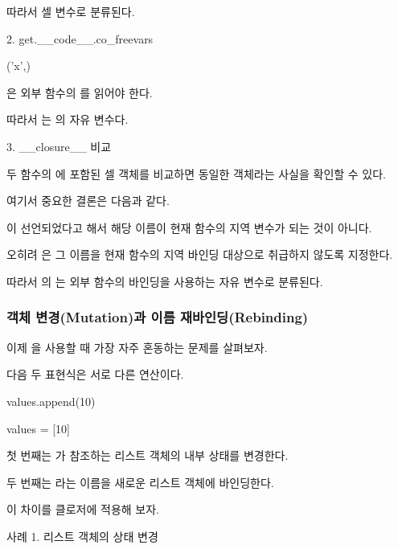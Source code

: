 따라서 셀 변수로 분류된다.

\begin{dhknote}
\begin{dhksmry}[centered]
2. get.__code__.co_freevars
\end{dhksmry}
\end{dhknote}

\begin{dhkzsh}
('x',)
\end{dhkzsh}

은 외부 함수의 를 읽어야 한다.

따라서 는 의 자유 변수다.

\begin{dhknote}
\begin{dhksmry}[centered]
3. __closure__ 비교
\end{dhksmry}
\end{dhknote}

두 함수의 에 포함된 셀 객체를 비교하면 동일한 객체라는 사실을 확인할 수 있다.

여기서 중요한 결론은 다음과 같다.

이 선언되었다고 해서 해당 이름이 현재 함수의 지역 변수가 되는 것이 아니다.

오히려 은 그 이름을 현재 함수의 지역 바인딩 대상으로 취급하지 않도록 지정한다.

따라서 의 는 외부 함수의 바인딩을 사용하는 자유 변수로 분류된다.

\subsubsection{객체 변경(Mutation)과 이름 재바인딩(Rebinding)}

이제 을 사용할 때 가장 자주 혼동하는 문제를 살펴보자.

다음 두 표현식은 서로 다른 연산이다.

\begin{dhkcode}
values.append(10)

values = [10]
\end{dhkcode}

첫 번째는 가 참조하는 리스트 객체의 내부 상태를 변경한다.

두 번째는 라는 이름을 새로운 리스트 객체에 바인딩한다.

이 차이를 클로저에 적용해 보자.

\begin{dhknote}
\begin{dhksmry}[centered]
사례 1. 리스트 객체의 상태 변경
\end{dhksmry}
\end{dhknote}

